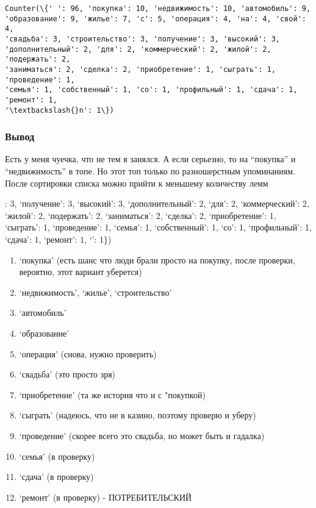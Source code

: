 \documentclass[11pt]{article}
\providecommand{\tightlist}{%
      \setlength{\itemsep}{0pt}\setlength{\parskip}{0pt}}
\begin{document}
    \begin{Verbatim}[commandchars=\\\{\}]
Counter(\{' ': 96, 'покупка': 10, 'недвижимость': 10, 'автомобиль': 9,
'образование': 9, 'жилье': 7, 'с': 5, 'операция': 4, 'на': 4, 'свой': 4,
'свадьба': 3, 'строительство': 3, 'получение': 3, 'высокий': 3,
'дополнительный': 2, 'для': 2, 'коммерческий': 2, 'жилой': 2, 'подержать': 2,
'заниматься': 2, 'сделка': 2, 'приобретение': 1, 'сыграть': 1, 'проведение': 1,
'семья': 1, 'собственный': 1, 'со': 1, 'профильный': 1, 'сдача': 1, 'ремонт': 1,
'\textbackslash{}n': 1\})
\end{Verbatim}

    \hypertarget{ux432ux44bux432ux43eux434}{%
\subsubsection{Вывод}\label{ux432ux44bux432ux43eux434}}

    Есть у меня чуечка, что не тем я занялся. А если серьезно, то на
``покупка'' и ``недвижимость'' в топе. Но этот топ только по
разношерстным упоминаниям. После сортировки списка можно прийти к
меньшему количеству лемм

: 3, `получение': 3, `высокий': 3, `дополнительный': 2, `для': 2,
`коммерческий': 2, `жилой': 2, `подержать': 2, `заниматься': 2,
`сделка': 2, `приобретение': 1, `сыграть': 1, `проведение': 1, `семья':
1, `собственный': 1, `со': 1, `профильный': 1, `сдача': 1, `ремонт': 1,
`\n': 1\})

\begin{enumerate}
\def\labelenumi{\arabic{enumi}.}
\tightlist
\item
  `покупка' (есть шанс что люди брали просто на покупку, после проверки,
  вероятно, этот вариант уберется)
\item
  `недвижимость', `жилье', `строительство'
\item
  `автомобиль'
\item
  `образование'
\item
  `операция' (снова, нужно проверить)
\item
  `свадьба' (это просто зря)
\item
  `приобретение' (та же история что и с "покупкой)
\item
  `сыграть' (надеюсь, что не в казино, поэтому проверю и уберу)
\item
  `проведение' (скорее всего это свадьба, но может быть и гадалка)
\item
  `семья' (в проверку)
\item
  `сдача' (в проверку)
\item
  `ремонт' (в проверку) - ПОТРЕБИТЕЛЬСКИЙ
\end{enumerate}
\end{document}
